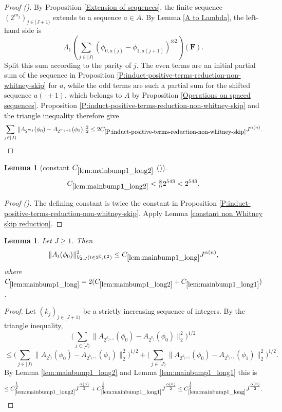 \documentclass[12pt,reqno]{amsart}
\newcommand{\auto}{{({\tiny\faCar})}}
\theoremstyle{plain}
\newtheorem{lemma}[theorem]{Lemma}
\numberwithin{equation}{section}
\theoremstyle{remark}
\newcommand{\uses}[1]{}
\newcommand{\usesdefs}[1]{}
\newcommand{\F}{\mathbf{F}}
\begin{document}
\begin{proof}[Proof \auto]
By Proposition \ref{Extension of sequences}, the finite sequence $(2^{m_j})_{j\in[J+1)}$ extends to a sequence $a\in A$. By Lemma \ref{A to Lambda}, the left-hand side is
\[
\Lambda_1\left(\sum_{j\in[J)}
(\phi_{0,a(j)}-\phi_{1,a(j+1)})^{\otimes2}\right)(\F).
\]
Split this sum according to the parity of $j$. The even terms are an initial partial sum of the sequence in Proposition \ref{P:induct-positive-terms-reduction-non-whitney-skip} for $a$, while the odd terms are such a partial sum for the shifted sequence $a(\cdot+1)$, which belongs to $A$ by Proposition \ref{Operations on spaced sequences}. Proposition \ref{P:induct-positive-terms-reduction-non-whitney-skip} and the triangle inequality therefore give
\[
\sum_{j\in[J)}
\|A_{2^{m_j}}(\phi_0)-A_{2^{m_{j+1}}}(\phi_1)\|_2^2
\le2C_{\ref{P:induct-positive-terms-reduction-non-whitney-skip}}J^{\alpha(n)}.
\]
\end{proof}

\begin{lemma}[constant $C_{\ref{lem:mainbump1_long2}}$ \auto]\label{constant main bump one long two}\uses{P:induct-positive-terms-reduction-non-whitney-skip,constant non Whitney skip reduction,lem:mainbump1_long2}\usesdefs{}
\begin{equation}\label{constant main bump one long two bound}
C_{\ref{lem:mainbump1_long2}}<\tfrac89 2^{543}<2^{543}.
\end{equation}
\end{lemma}
\begin{proof}[Proof \auto]
The defining constant is twice the constant in Proposition \ref{P:induct-positive-terms-reduction-non-whitney-skip}. Apply Lemma \ref{constant non Whitney skip reduction}.
\end{proof}

\begin{lemma}\label{lem:mainbump1_long}\uses{lem:mainbump1_long2,lem:mainbump1_long1}\usesdefs{A_def,def:unipair}
Let $J\ge 1$. Then
\begin{equation}\label{mainbump1_long}
\|A_{t}(\phi_0)\|^2_{V_{2,J}(t\in 2^\mathbb{Z}; L^2)}  \le C_{\ref{lem:mainbump1_long}} J^{\alpha(n)},
\end{equation}
where $C_{\ref{lem:mainbump1_long}}=2(C_{\ref{lem:mainbump1_long2}} + C_{\ref{lem:mainbump1_long1}})$.
\end{lemma}

\begin{proof}
Let $(k_j)_{j\in [J+1)}$ be a strictly increasing sequence of integers.
By the triangle inequality,
\[ \Big(\sum_{j\in [J)} \|A_{2^{k_{j+1}}}(\phi_0)- A_{2^{k_j}}(\phi_0)\|_2^2\Big)^{1/2} \]
\[ \le \Big(\sum_{j\in [J)} \|A_{2^{k_{j}}}(\phi_0)- A_{2^{k_{j+1}}}(\phi_1)\|_2^2\Big)^{1/2}
+ \Big(\sum_{j\in [J)} \|A_{2^{k_{j+1}}}(\phi_0)- A_{2^{k_{j+1}}}(\phi_1)\|_2^2\Big)^{1/2}.
\]
By Lemma \ref{lem:mainbump1_long2} and Lemma \ref{lem:mainbump1_long1} this is
\[ \le C_{\ref{lem:mainbump1_long2}}^{\tfrac12} J^{\tfrac{\alpha(n)}{2}} + C_{\ref{lem:mainbump1_long1}}^{\tfrac12} J^{\tfrac{\alpha(n)}{2}} \le C_{\ref{lem:mainbump1_long}}^{\tfrac12} J^{\tfrac{\alpha(n)}{2}}.  \]
\end{proof}
\end{document}
